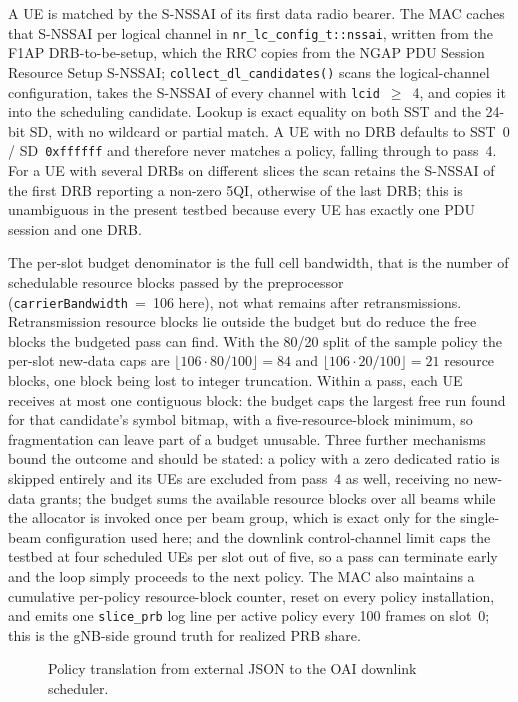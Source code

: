 A UE is matched by the S-NSSAI of its first data radio bearer. The MAC caches that S-NSSAI per logical channel in \texttt{nr\_lc\_config\_t::nssai}, written from the F1AP DRB-to-be-setup, which the RRC copies from the NGAP PDU Session Resource Setup S-NSSAI; \texttt{collect\_dl\_candidates()} scans the logical-channel configuration, takes the S-NSSAI of every channel with \texttt{lcid}~$\geq$~4, and copies it into the scheduling candidate. Lookup is exact equality on both SST and the 24-bit SD, with no wildcard or partial match. A UE with no DRB defaults to SST~0 / SD~\texttt{0xffffff} and therefore never matches a policy, falling through to pass~4. For a UE with several DRBs on different slices the scan retains the S-NSSAI of the first DRB reporting a non-zero 5QI, otherwise of the last DRB; this is unambiguous in the present testbed because every UE has exactly one PDU session and one DRB.

The per-slot budget denominator is the full cell bandwidth, that is the number of schedulable resource blocks passed by the preprocessor (\texttt{carrierBandwidth}~=~106 here), not what remains after retransmissions. Retransmission resource blocks lie outside the budget but do reduce the free blocks the budgeted pass can find. With the 80/20 split of the sample policy the per-slot new-data caps are $\lfloor 106\cdot 80/100\rfloor=84$ and $\lfloor 106\cdot 20/100\rfloor=21$ resource blocks, one block being lost to integer truncation. Within a pass, each UE receives at most one contiguous block: the budget caps the largest free run found for that candidate's symbol bitmap, with a five-resource-block minimum, so fragmentation can leave part of a budget unusable. Three further mechanisms bound the outcome and should be stated: a policy with a zero dedicated ratio is skipped entirely and its UEs are excluded from pass~4 as well, receiving no new-data grants; the budget sums the available resource blocks over all beams while the allocator is invoked once per beam group, which is exact only for the single-beam configuration used here; and the downlink control-channel limit caps the testbed at four scheduled UEs per slot out of five, so a pass can terminate early and the loop simply proceeds to the next policy. The MAC also maintains a cumulative per-policy resource-block counter, reset on every policy installation, and emits one \texttt{slice\_prb} log line per active policy every 100 frames on slot~0; this is the gNB-side ground truth for realized PRB share.

\begin{figure}[t]
  \centering
  
  \caption{Policy translation from external JSON to the OAI downlink scheduler.}
  \label{fig:oai-path}
\end{figure}

